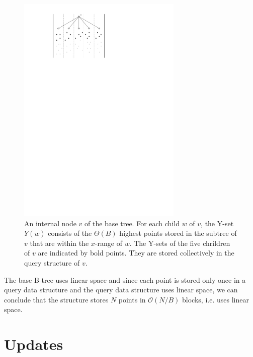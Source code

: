 \documentclass[twoside,11pt,openright]{report}
\begin{document}
\begin{figure}[h]
	\centering
	\includegraphics[width=0.7\textwidth]{../figures/arge_child_structure}
	\caption{An internal node $v$ of the base tree. For each child $w$ of $v$, the Y-set $Y(w)$ consists of the $\Theta(B)$ highest points stored in the subtree of $v$ that are within the $x$-range of $w$. The Y-sets of the five chrildren of $v$ are indicated by bold points. They are stored collectively in the query structure of $v$.}
	\label{fig:arge_child_strucutre}
\end{figure}


The base B-tree uses linear space and since each point is stored only once in a query data structure and the query data structure uses linear space, we can conclude that the structure stores $N$ points in $\mathcal{O}(N/B)$ blocks, i.e. uses linear space.

\section{Updates}
\label{sec:arge_updates}
\end{document}
